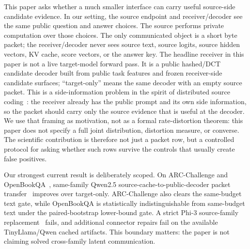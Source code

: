 \documentclass{article}
\newcommand{\arc}{ARC-Challenge}
\newcommand{\obqa}{OpenBookQA}
\begin{document}
This paper asks whether a much smaller interface can carry useful source-side candidate evidence. In our setting, the source endpoint and receiver/decoder see the same public question and answer choices. The source performs private computation over those choices. The only communicated object is a short byte packet; the receiver/decoder never sees source text, source logits, source hidden vectors, KV cache, score vectors, or the answer key. The headline receiver in this paper is not a live target-model forward pass. It is a public hashed/DCT candidate decoder built from public task features and frozen receiver-side candidate surfaces; ``target-only'' means the same decoder with an empty source packet. This is a side-information problem in the spirit of distributed source coding~\citep{Slepian1973Noiseless,Wyner1976RateDistortion,Whang2021NeuralDSC,Ozyilkan2023WynerZiv}: the receiver already has the public prompt and its own side information, so the packet should carry only the source evidence that is useful at the decoder. We use that framing as motivation, not as a formal rate-distortion theorem: this paper does not specify a full joint distribution, distortion measure, or converse. The scientific contribution is therefore not just a packet row, but a controlled protocol for asking whether such rows survive the controls that usually create false positives.

Our strongest current result is deliberately scoped. On \arc{} and \obqa{}~\citep{Clark2018ARC,Mihaylov2018OpenBookQA}, same-family Qwen2.5 source-cache-to-public-decoder packet transfer~\citep{Yang2025Qwen25} improves over target-only. \arc{} also clears the same-budget text gate, while \obqa{} is statistically indistinguishable from same-budget text under the paired-bootstrap lower-bound gate. A strict Phi-3 source-family replacement~\citep{Abdin2024Phi3} fails, and additional connector repairs fail on the available TinyLlama/Qwen cached artifacts. This boundary matters: the paper is not claiming solved cross-family latent communication.
\end{document}
